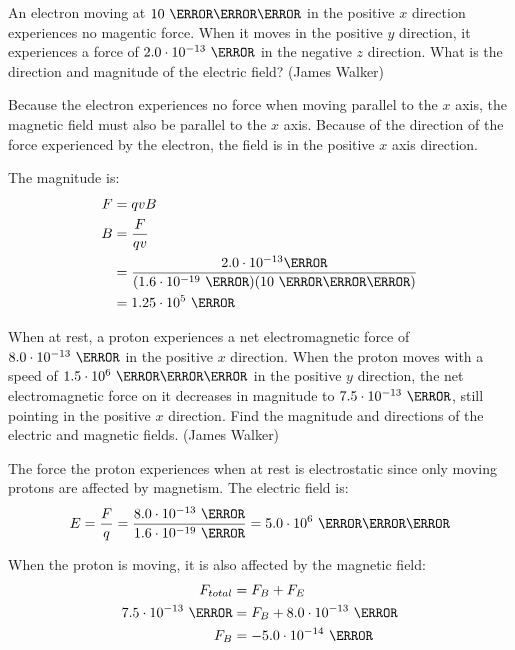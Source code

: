 \documentclass{exam}
\begin{document}
\begin{questions}

  \question An electron moving at $10 \ \meter \per \second$ in the positive $x$ direction experiences no magentic
  force.  When it moves in the positive $y$ direction, it experiences a force of $2.0 \cdot 10^{-13} \ \newton$ in the
  negative $z$ direction.  What is the direction and magnitude of the electric field? (James Walker)

\begin{solution}

Because the electron experiences no force when moving parallel to the $x$ axis, the magnetic field must also be parallel
to the $x$ axis.  Because of the direction of the force experienced by the electron, the field is in the positive $x$
axis direction.

The magnitude is:
\begin{align*}
  F &= qvB \\
  B &= \frac{F}{qv} \\
    &= \frac{2.0 \cdot 10^{-13} \newton}{(1.6 \cdot 10^{-19} \ \coulomb)(10 \ \meter \per \second)} \\
    &= 1.25 \cdot 10^5 \ \tesla \\
\end{align*}

\end{solution}

\question 
When at rest, a proton experiences a net electromagnetic force of $8.0 \cdot 10^{-13} \ \newton$ in the
positive $x$ direction.  When the proton moves with a speed of $1.5 \cdot 10^6 \ \meter \per \second$ in the positive
$y$ direction, the net electromagnetic force on it decreases in magnitude to $7.5 \cdot 10^{-13} \ \newton$, still
pointing in the positive $x$ direction.  Find the magnitude and directions of the electric and magnetic fields. (James
Walker)

\begin{solution}
The force the proton experiences when at rest is electrostatic since only moving protons are affected by magnetism.  The electric field is:
\[
  E = \frac{F}{q} = \frac{8.0 \cdot 10^{-13} \ \newton}{1.6 \cdot 10^{-19} \ \coulomb} = 5.0 \cdot 10^{6} \ \newton \per \coulomb
\]

When the proton is moving, it is also affected by the magnetic field:
\begin{align*}
  F_{total} &= F_{B} + F_{E} \\
  7.5 \cdot 10^{-13} \ \newton &= F_{B} + 8.0 \cdot 10^{-13} \ \newton \\
  F_{B} &= -5.0 \cdot 10^{-14} \ \newton \\
\end{align*}


\end{solution}
\end{questions}
\end{document}
